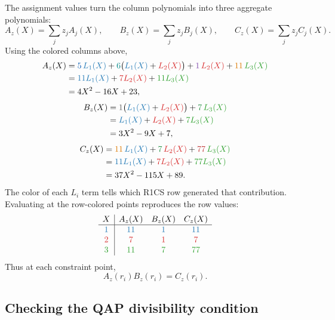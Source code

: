 \documentclass[11pt]{article}
\newcommand{\constwire}[1]{\textcolor{wireconstcolor}{#1}}
\newcommand{\xone}[1]{\textcolor{wirexonecolor}{#1}}
\newcommand{\xtwo}[1]{\textcolor{wirextwocolor}{#1}}
\newcommand{\wone}[1]{\textcolor{wirewonecolor}{#1}}
\newcommand{\vone}[1]{\textcolor{wirevonecolor}{#1}}
\newcommand{\vtwo}[1]{\textcolor{wirevtwocolor}{#1}}
\newcommand{\ywire}[1]{\textcolor{wireycolor}{#1}}
\newcommand{\rowone}[1]{\textcolor{rowonecolor}{#1}}
\newcommand{\rowtwo}[1]{\textcolor{rowtwocolor}{#1}}
\newcommand{\rowthree}[1]{\textcolor{rowthreecolor}{#1}}
\begin{document}
The assignment values turn the column polynomials into three aggregate polynomials:
\[
    A_z(X)=\sum_j z_jA_j(X),
    \qquad
    B_z(X)=\sum_j z_jB_j(X),
    \qquad
    C_z(X)=\sum_j z_jC_j(X).
\]
Using the colored columns above,
\[
\begin{aligned}
A_z(X)
&=\xone{5}\,\rowone{L_1(X)}
 +\xtwo{6}\bigl(\rowone{L_1(X)}+\rowtwo{L_2(X)}\bigr)
 +\wone{1}\,\rowtwo{L_2(X)}
 +\vone{11}\,\rowthree{L_3(X)}\\
&=\rowone{11L_1(X)}+\rowtwo{7L_2(X)}+\rowthree{11L_3(X)}\\
&=4X^2-16X+23,
\end{aligned}
\]
\[
\begin{aligned}
B_z(X)
&=\constwire{1}\bigl(\rowone{L_1(X)}+\rowtwo{L_2(X)}\bigr)
 +\vtwo{7}\,\rowthree{L_3(X)}\\
&=\rowone{L_1(X)}+\rowtwo{L_2(X)}+\rowthree{7L_3(X)}\\
&=3X^2-9X+7,
\end{aligned}
\]
\[
\begin{aligned}
C_z(X)
&=\vone{11}\,\rowone{L_1(X)}+\vtwo{7}\,\rowtwo{L_2(X)}+\ywire{77}\,\rowthree{L_3(X)}\\
&=\rowone{11L_1(X)}+\rowtwo{7L_2(X)}+\rowthree{77L_3(X)}\\
&=37X^2-115X+89.
\end{aligned}
\]
The color of each $L_i$ term tells which R1CS row generated that contribution. Evaluating at the row-colored points reproduces the row values:
\[
\begin{array}{c|ccc}
X & A_z(X) & B_z(X) & C_z(X) \\
\hline
\rowone{1} & \rowone{11} & \rowone{1} & \rowone{11} \\
\rowtwo{2} & \rowtwo{7} & \rowtwo{1} & \rowtwo{7} \\
\rowthree{3} & \rowthree{11} & \rowthree{7} & \rowthree{77}
\end{array}
\]
Thus at each constraint point,
\[
    A_z(r_i)B_z(r_i)=C_z(r_i).
\]

\subsection{Checking the QAP divisibility condition}
\end{document}
